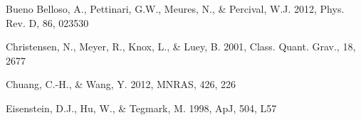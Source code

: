 \documentclass[iop]{emulateapj}
\begin{document}
\begin{thebibliography}{}




Bueno Belloso, A., Pettinari, G.W., Meures, N., \& Percival, W.J. 2012, Phys. Rev. D, 86, 023530




Christensen, N., Meyer, R., Knox, L., \& Luey, B. 2001, Class. Quant. Grav., 18, 2677


Chuang, C.-H., \& Wang, Y. 2012, MNRAS, 426, 226  






Eisenstein, D.J., Hu, W., \& Tegmark, M. 1998, ApJ, 504, L57







\end{thebibliography}
\end{document}
